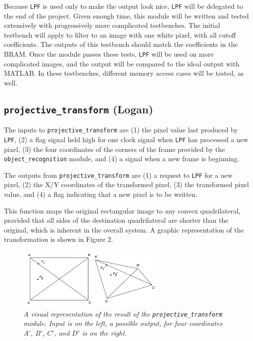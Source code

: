 \documentclass[10pt]{article}
\begin{document}
Because {\tt LPF} is used only to make the output look nice, {\tt LPF} will be delegated to the end of the project. Given enough time, this module will be written and tested extensively with progressively more complicated testbenches. The initial testbench will apply to filter to an image with one white pixel, with all cutoff coefficients. The outputs of this testbench should match the coefficients in the BRAM. Once the module passes these tests, {\tt LPF} will be used on more complicated images, and the output will be compared to the ideal output with MATLAB. In these testbenches, different memory access cases will be tested, as well.

\subsection{{\tt projective\_transform} (Logan)}
The inputs to {\tt projective\_transform} are (1) the pixel value last produced by {\tt LPF}, (2) a flag signal held high for one clock signal when {\tt LPF} has processed a new pixel, (3) the four coordinates of the corners of the frame provided by the {\tt object\_recognition} module, and (4) a signal when a new frame is beginning.

The outputs from {\tt projective\_transform} are (1) a request to {\tt LPF} for a new pixel, (2) the X/Y coordinates of the transformed pixel, (3) the transformed pixel value, and (4) a flag indicating that a new pixel is to be written.

This function maps the original rectangular image to any convex quadrilateral, provided that all sides of the destination quadrilateral are shorter than the original, which is inherent in the overall system. A graphic representation of the transformation is shown in Figure 2.

\begin{figure}[h!]
\centering
\includegraphics[width=0.65\textwidth]{arbiskew_graphic.png}
\caption{\emph{A visual representation of the result of the {\tt projective\_transform} module. Input is on the left, a possible output, for four coordinates $A\prime$, $B\prime$, $C\prime$, and $D\prime$ is on the right.}}
\end{figure}
\end{document}
